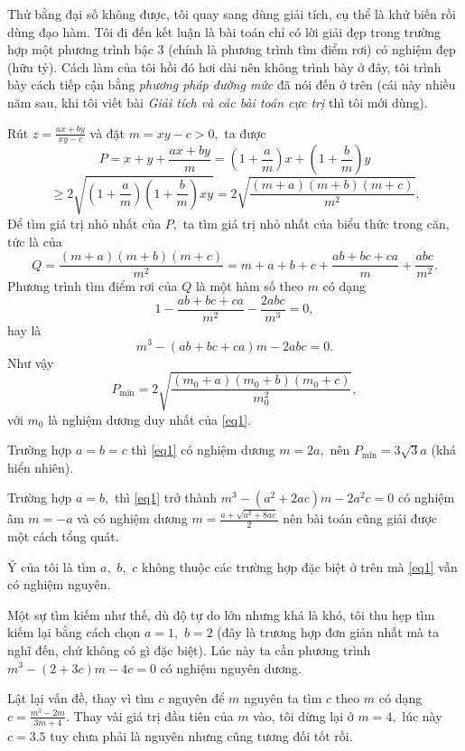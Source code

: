 \documentclass[12pt,a4paper]{book}
\begin{document}
Thử bằng đại số không được, tôi quay sang dùng giải tích, cụ thể là khử biến rồi dùng đạo hàm. Tôi đi đến kết luận là bài toán chỉ có lời giải đẹp trong trường hợp một phương trình bậc $3$ (chính là phương trình tìm điểm rơi) có nghiệm đẹp (hữu tỷ). Cách làm của tôi hồi đó hơi dài nên không trình bày ở đây, tôi trình bày cách tiếp cận bằng \textit{phương pháp đường mức} đã nói đến ở trên (cái này nhiều năm sau, khi tôi viết bài \textit{Giải tích và các bài toán cực trị} thì tôi mới dùng).

Rút $z=\frac{a x+b y}{x y-c}$ và đặt $m=xy-c>0,$ ta được
$$P=x+y+\frac{a x+b y}{m}=\left(1+\frac{a}{m}\right) x+\left(1+\frac{b}{m}\right) y $$
$$\geq 2 \sqrt{\left(1+\frac{a}{m}\right)\left(1+\frac{b}{m}\right) x y}=2 \sqrt{\frac{(m+a)(m+b)(m+c)}{m^{2}}}.$$
Để tìm giá trị nhỏ nhất của $P,$ ta tìm giá trị nhỏ nhất của biểu thức trong căn, tức là của
$$Q=\frac{(m+a)(m+b)(m+c)}{m^{2}}=m+a+b+c+\frac{a b+b c+c a}{m}+\frac{a b c}{m^{2}}.$$
Phương trình tìm điểm rơi của $Q$ là một hàm số theo $m$ có dạng
$$1-\frac{a b+b c+c a}{m^{2}}-\frac{2 a b c}{m^{3}}=0,$$
hay là
\begin{equation}\label{eq1}
m^{3}-(a b+b c+c a) m-2 a b c=0.
\end{equation}
Như vậy
$$P_{\min }=2 \sqrt{\frac{\left(m_{0}+a\right)\left(m_{0}+b\right)\left(m_{0}+c\right)}{m_{0}^{2}}},$$
với ${m}_{0}$ là nghiệm dương duy nhất của \eqref{eq1}.

Trường hợp $a ={b}={c}$ thì \eqref{eq1} có nghiệm dương ${m}=2 {a},$ nên $P_{\min }=3 \sqrt{3} a$ (khá hiển nhiên).

Trường hợp $a =b,$ thì \eqref{eq1} trở thành $m^{3}-\left(a^{2}+2 a c\right) m-2 a^{2} c=0$ có nghiệm âm $m=- a$ và có nghiệm dương $m=\frac{a+\sqrt{a^{2}+8 a c}}{2}$ nên bài toán cũng giải được một cách tổng quát.

Ý của tôi là tìm $a,$ $b,$ $c$ không thuộc các trường hợp đặc biệt ở trên mà \eqref{eq1} vẫn có nghiệm nguyên.

Một sự tìm kiếm như thế, dù độ tự do lớn nhưng khá là khó, tôi thu hẹp tìm kiếm lại bằng cách chọn $a =1,$ $b=2$ (đây là trương hợp đơn giản nhất mà ta nghĩ đến, chứ không có gì đặc biệt). Lúc này ta cần phương trình $m ^{3}-(2+3 c) m-4 c=0$ có nghiệm nguyên dương.

Lật lại vấn đề, thay vì tìm $c$ nguyên để $m$ nguyên ta tìm $c$ theo $m$ có dạng $c=\frac{m^{3}-2 m}{3 m+4}.$ Thay vài giá trị đầu tiên của $m$ vào, tôi dừng lại ở $m = 4,$ lúc này $c = 3.5$ tuy chưa phải là nguyên nhưng cũng tương đối tốt rồi.
\end{document}
